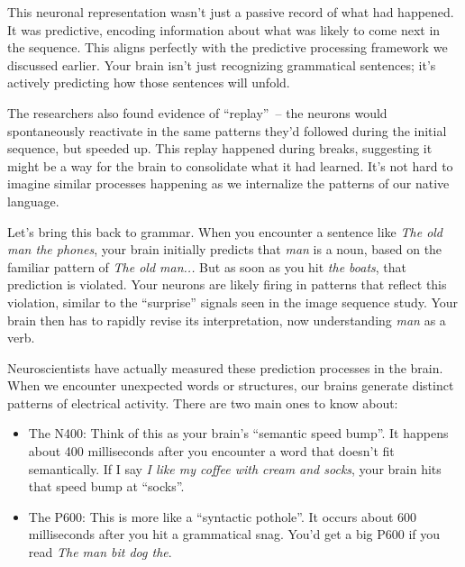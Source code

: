 This neuronal representation wasn't just a passive record of what had happened. It was predictive, encoding information about what was likely to come next in the sequence. This aligns perfectly with the predictive processing framework we discussed earlier. Your brain isn't just recognizing grammatical sentences; it's actively predicting how those sentences will unfold.

The researchers also found evidence of ``replay''~-- the neurons would spontaneously reactivate in the same patterns they'd followed during the initial sequence, but speeded up. This replay happened during breaks, suggesting it might be a way for the brain to consolidate what it had learned. It's not hard to imagine similar processes happening as we internalize the patterns of our native language.

Let's bring this back to grammar. When you encounter a sentence like \textit{The old man the phones}, your brain initially predicts that \textit{man} is a noun, based on the familiar pattern of \textit{The old man...} But as soon as you hit \textit{the boats}, that prediction is violated. Your neurons are likely firing in patterns that reflect this violation, similar to the ``surprise'' signals seen in the image sequence study. Your brain then has to rapidly revise its interpretation, now understanding \textit{man} as a verb.

Neuroscientists have actually measured these prediction processes in the brain. When we encounter unexpected words or structures, our brains generate distinct patterns of electrical activity. There are two main ones to know about:

\begin{itemize}
    \item The N400: Think of this as your brain's ``semantic speed bump''. It happens about 400 milliseconds after you encounter a word that doesn't fit semantically. If I say \textit{I like my coffee with cream and socks}, your brain hits that speed bump at ``socks''.
    \item The P600: This is more like a ``syntactic pothole''. It occurs about 600 milliseconds after you hit a grammatical snag. You'd get a big P600 if you read \textit{The man bit dog the}.
\end{itemize}

